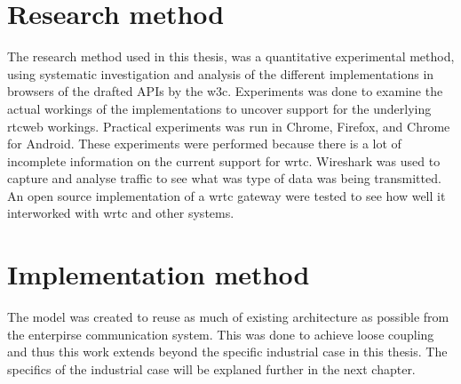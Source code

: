 \section{Research method}
The research method used in this thesis, was a quantitative experimental method, using systematic investigation and analysis of the different implementations in browsers of the drafted APIs by the \gls{w3c}. Experiments was done to examine the actual workings of the implementations to uncover support for the underlying \gls{rtcweb} workings. Practical experiments was run in Chrome, Firefox, and Chrome for Android. These experiments were performed because there is a lot of incomplete information on the current support for \gls{wrtc}. Wireshark was used to capture and analyse traffic to see what was type of data was being transmitted. An open source implementation of a \gls{wrtc} gateway were tested to see how well it interworked with \gls{wrtc} and other systems. 

\section{Implementation method}
The model was created to reuse as much of existing architecture as possible from the enterpirse communication system. This was done to achieve loose coupling and thus this work extends beyond the specific industrial case in this thesis. The specifics of the industrial case will be explaned further in the next chapter.





